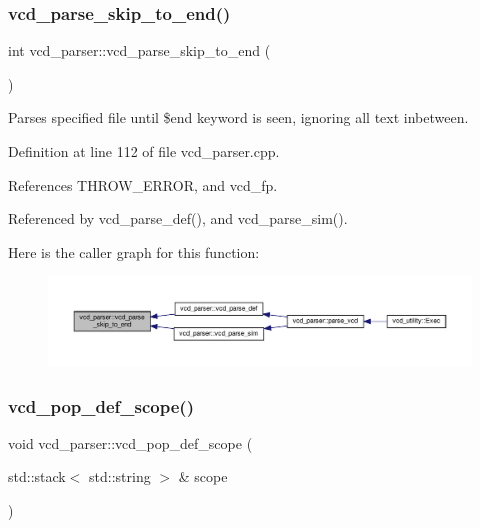 \subsubsection{\texorpdfstring{vcd\+\_\+parse\+\_\+skip\+\_\+to\+\_\+end()}{vcd\_parse\_skip\_to\_end()}}
{\footnotesize\ttfamily int vcd\+\_\+parser\+::vcd\+\_\+parse\+\_\+skip\+\_\+to\+\_\+end (\begin{DoxyParamCaption}{ }\end{DoxyParamCaption})\hspace{0.3cm}{\ttfamily [private]}}



Parses specified file until \$end keyword is seen, ignoring all text inbetween. 



Definition at line 112 of file vcd\+\_\+parser.\+cpp.



References T\+H\+R\+O\+W\+\_\+\+E\+R\+R\+OR, and vcd\+\_\+fp.



Referenced by vcd\+\_\+parse\+\_\+def(), and vcd\+\_\+parse\+\_\+sim().

Here is the caller graph for this function\+:
\nopagebreak
\begin{figure}[H]
\begin{center}
\leavevmode
\includegraphics[width=350pt]{d2/d25/classvcd__parser_a8bb5288c3fe26415a1a154a1edabf418_icgraph}
\end{center}
\end{figure}
\mbox{\label{classvcd__parser_a59e4c34514e6722d541aa013d02eaa32}} 
\subsubsection{\texorpdfstring{vcd\+\_\+pop\+\_\+def\+\_\+scope()}{vcd\_pop\_def\_scope()}}
{\footnotesize\ttfamily void vcd\+\_\+parser\+::vcd\+\_\+pop\+\_\+def\+\_\+scope (\begin{DoxyParamCaption}\item[{std\+::stack$<$ std\+::string $>$ \&}]{scope }\end{DoxyParamCaption})\hspace{0.3cm}{\ttfamily [private]}}



